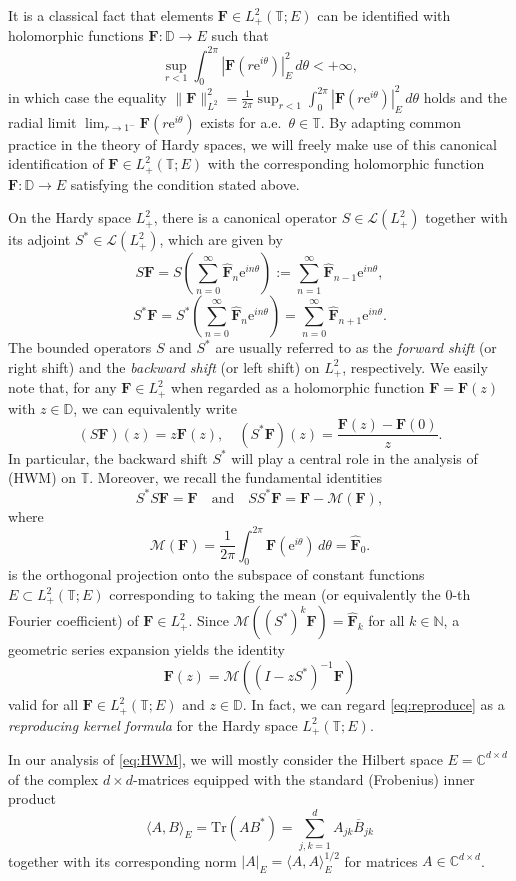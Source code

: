 \documentclass[10pt,reqno,a4paper]{amsart}
\theoremstyle{definition}
\theoremstyle{remark}
\theoremstyle{remark}
\numberwithin{equation}{section}
\newcommand{\C}{\mathbb{C}}
\newcommand{\N}{\mathbb{N}}
\newcommand{\T}{\mathbb{T}}
\newcommand{\D}{\mathbb{D}}
\newcommand{\Mean}{\mathscr{M}}
\newcommand{\ov}{\overline}
\newcommand{\be}{\begin{equation}}
\newcommand{\ee}{\end{equation}}
\newcommand{\eu}{\mathrm{e}}
\newcommand{\Fb}{\mathbf{F}}
\newcommand{\id}{I}
\newcommand{\Tr}{\mathrm{Tr}}
\newcommand{\Ls}{\mathscr{L}}
\begin{document}
It is a classical fact that elements $\Fb \in L^2_+(\T; E)$ can be identified with holomorphic functions $\Fb : \D \to E$ such that 
$$
\sup_{r < 1} \int_0^{2 \pi} |\Fb(r \eu^{i \theta})|^2_E \, d\theta < +\infty,
$$
in which case the equality $\| \Fb \|_{L^2}^2 = \frac{1}{2\pi} \sup_{r < 1} \int_0^{2 \pi} |\Fb(r \eu^{i\theta})|^2_E \, d \theta$ holds and the radial limit $\lim_{r \to 1^{-}} \Fb(r \eu^{i \theta})$ exists for a.e.~$\theta \in \T$. By adapting common practice in the theory of Hardy spaces, we will freely make use of this canonical identification of $\Fb \in L^2_+(\T;E)$ with the corresponding holomorphic function $\Fb : \D \to E$ satisfying the condition stated above. 

On the Hardy space $L^2_+$, there is a canonical operator $S \in \Ls(L^2_+)$ together with its adjoint $S^* \in \Ls(L^2_+)$, which are given by
$$
S \Fb= S \left ( \sum_{n=0}^\infty \widehat{\Fb}_n \eu^{in \theta} \right ) := \sum_{n=1}^\infty \widehat{\Fb}_{n-1}  \eu^{in\theta}, 
$$
$$
S^* \Fb= S^*\left ( \sum_{n=0}^\infty \widehat{\Fb}_n \eu^{in \theta} \right ) = \sum_{n=0}^\infty \widehat{\Fb}_{n+1} \eu^{in \theta}.
$$
The bounded operators $S$ and $S^*$ are usually referred to as the {\em forward shift} (or right shift) and the {\em backward shift} (or left shift) on $L^2_+$, respectively.  We easily note that, for any $\Fb \in L^2_+$ when regarded as a holomorphic function $\Fb=\Fb(z)$ with $z \in \D$, we can equivalently  write
$$
(S \Fb)(z) = z \Fb(z), \quad (S^* \Fb)(z) = \frac{\Fb(z)-\Fb(0)}{z}.
$$
In particular, the backward shift $S^*$ will play a central role in the analysis of (HWM) on $\T$. Moreover, we recall the fundamental identities
\be \label{eq:Sdefect}
S^* S \Fb = \Fb \quad \mbox{and} \quad S S^* \Fb = \Fb - \Mean(\Fb),
\ee
where 
$$
 \Mean(\Fb) =\frac{1}{2 \pi} \int_0^{2 \pi} \Fb(\eu^{i \theta}) \, d\theta = \widehat{\Fb}_0.
$$
is the orthogonal projection onto the subspace of constant functions $E \subset L^2_+(\T; E)$ corresponding to taking the mean (or equivalently the $0$-th Fourier coefficient) of $\Fb \in L^2_+$. Since $\Mean((S^*)^k \Fb) = \widehat{\Fb}_k$ for all $k \in \N$, a geometric series expansion yields the identity
\be \label{eq:reproduce}
\boxed{\Fb(z) = \Mean \left ( ( \id - z S^*)^{-1} \Fb \right )}
\ee 
valid for all $\Fb \in L^2_+(\T; E)$ and $z \in \D$. In fact, we can regard \eqref{eq:reproduce} as a {\em reproducing kernel formula} for the Hardy space $L^2_+(\T;E)$.

In our analysis of \eqref{eq:HWM}, we will mostly consider the Hilbert space $E =\C^{d \times d}$ of the complex $d \times d$-matrices equipped with the standard (Frobenius) inner product 
$$
\langle A, B \rangle_E = \Tr (A B^*) = \sum_{j,k=1}^d A_{jk} \ov{B}_{jk}
$$
together with its corresponding norm $|A|_E = \langle A, A \rangle_E^{1/2}$ for matrices $A \in \C^{d \times d}$.
\end{document}
